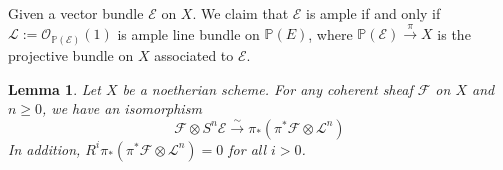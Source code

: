 \documentclass{ctexart}
\newtheorem{lemma}{Lemma}[section]
\begin{document}
Given a vector bundle $\mathcal{E}$ on $X$.
We claim that $\mathcal{E}$ is ample if and only if $\mathcal{L} := \mathcal{O}_{\mathbb{P}(\mathcal{E})}(1)$ is ample line bundle on $\mathbb{P}(E)$,
where $\mathbb{P}(\mathcal{E}) \overset{\pi}{\rightarrow} X$ is the projective bundle on $X$ associated to $\mathcal{E}$.
\begin{lemma}
    Let $X$ be a noetherian scheme.
    For any coherent sheaf $\mathcal{F}$ on $X$ and $n \ge 0$,
    we have an isomorphism
    \begin{equation}
        \mathcal{F} \otimes S^{n}\mathcal{E} \overset{\sim}{\longrightarrow} \pi_{\ast}(\pi^{\ast}\mathcal{F} \otimes \mathcal{L}^{n})
    \end{equation}
    In addition, $R^{i}\pi_{\ast}(\pi^{\ast}\mathcal{F} \otimes \mathcal{L}^{n}) = 0$ for all $i > 0$.
    \label{Lemma 4.2}
\end{lemma}
\end{document}

